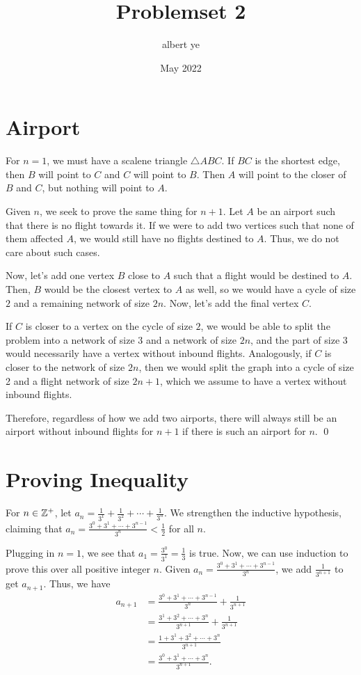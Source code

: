 \documentclass{article}
\title{Problemset 2}
\author{albert ye}
\date{May 2022}
\begin{document}
\maketitle

\section{Airport}
For $n=1$, we must have a scalene triangle $\triangle ABC$. If $BC$ is 
the shortest edge, then $B$ will point to $C$ and $C$ will point to $B$. Then 
$A$ will point to the closer of $B$ and $C$, but nothing will point to $A$.

Given $n$, we seek to prove the same thing for $n+1$. Let $A$
be an airport such that there is no flight towards it. If we were to add two 
vertices such that none of them affected $A$, we would still have no flights 
destined to $A$. Thus, we do not care about such cases. 

Now, let's add one vertex $B$ close to $A$ such that a flight would be destined to $A$. Then, 
$B$ would be the closest vertex to $A$ as well, so we would have a cycle of size $2$
and a remaining network of size $2n$. Now, let's add the final vertex $C$. 

If $C$ is
closer to a vertex on the cycle of size $2$, we would be able to split the problem 
into a network of size $3$ and a network of size $2n$, and the part of size $3$ would 
necessarily have a vertex without inbound flights. Analogously, if $C$ is closer to 
the network of size $2n$, then we would split the graph into a cycle of size 2 
and a flight network of size $2n+1$, which we assume to have a vertex without inbound flights. 

Therefore, regardless of how we add two airports, there will 
always still be an airport without inbound flights for $n+1$ if there is such 
an airport for $n$. \qed

\section{Proving Inequality}
For $n \in \mathbb Z^+$, let $a_n = \frac{1}{3^1} + \frac{1}{3^2} + \cdots + \frac{1}{3^n}$.
We strengthen the inductive hypothesis, claiming that 
$a_n = \frac{3^0 + 3^1 + \cdots + 3^{n-1}}{3^n} < \frac{1}{2}$ for all $n$.

Plugging in $n=1$, we see that $a_1 = \frac{3^0}{3^1} = \frac{1}{3}$ is true. Now,
we can use induction to prove this over all positive integer $n$. Given 
$a_n = \frac{3^0 + 3^1 + \cdots + 3^{n-1}}{3^n}$, we add $\frac{1}{3^{n+1}}$ to get 
$a_{n+1}$. Thus, we have 
\begin{align*}
	a_{n+1} &= \frac{3^0 + 3^1 + \cdots + 3^{n-1}}{3^n} + \frac{1}{3^{n+1}} \\
	&= \frac{3^1 + 3^2 + \cdots + 3^n}{3^{n+1}} + \frac{1}{3^{n+1}} \\
	&= \frac{1 + 3^1 + 3^2 + \cdots + 3^n}{3^{n+1}} \\
	&= \frac{3^0 + 3^1 + \cdots + 3^n}{3^{n+1}}.
\end{align*}
\end{document}
